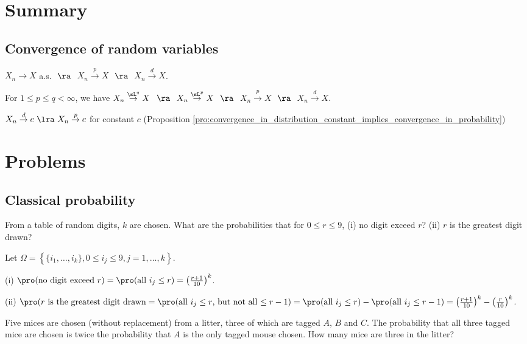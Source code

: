 \section{Summary}

\subsection{Convergence of random variables}

$X_n \to X$ a.s. $\ \ra \ $ $X_n \stackrel{p}{\to} X$ $\ \ra\ $ $X_n \stackrel{d}{\to} X$.

For $1\leq p\leq q <\infty$, we have $X_n \stackrel{\sL^q}{\to} X$ $\ \ra\ $ $X_n \stackrel{\sL^p}{\to} X$ $\ \ra\ $ $X_n \stackrel{p}{\to} X$ $\ \ra\ $ $X_n \stackrel{d}{\to} X$.

$X_n \stackrel{d}{\to}c \ \lra\ X_n \stackrel{p}{\to}c$ for constant $c$ (Proposition \ref{pro:convergence_in_distribution_constant_implies_convergence_in_probability})



\section{Problems}

\subsection{Classical probability}

\begin{problem}
From a table of random digits, $k$ are chosen. What are the probabilities that for $0\leq r\leq 9$, (i) no digit exceed $r$? (ii) $r$ is the greatest digit drawn?
\end{problem}

\begin{solution}[\bf Solution.]
Let $\Omega=\left\{\{i_1,\dots,i_k\}, 0\leq i_j\leq 9, j=1,\dots,k\right\}$.
\ben
\item [(i)] $\pro(\text{no digit exceed $r$}) = \pro(\text{all $i_j\leq r$})=\left(\frac{r+1}{10}\right)^k$.
\item [(ii)] $\pro(\text{$r$ is the greatest digit drawn} = \pro(\text{all $i_j\leq r$, but not all $\leq r-1$}) = \pro(\text{all $i_j\leq r$}) - \pro(\text{all $i_j\leq r-1$}) = \left(\frac{r+1}{10}\right)^k -\left(\frac{r}{10}\right)^k$.
\een
\end{solution}


\begin{problem}
Five mices are chosen (without replacement) from a litter, three of which are tagged $A$, $B$ and $C$. The probability that all three tagged mice are chosen is twice the probability that $A$ is the only tagged mouse chosen. How many mice are three in the litter?
\end{problem}

